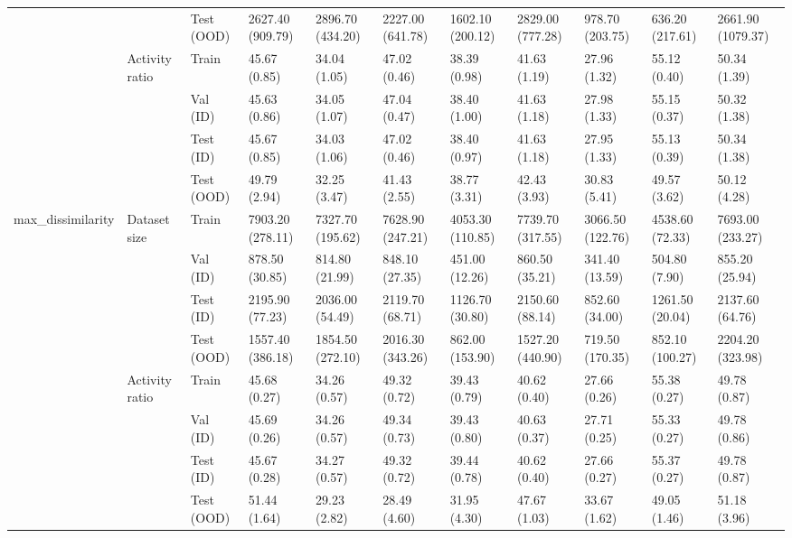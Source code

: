 \begin{tabular}{lllllllllll}
 &  & Test (OOD) & 2627.40 (909.79) & 2896.70 (434.20) & 2227.00 (641.78) & 1602.10 (200.12) & 2829.00 (777.28) & 978.70 (203.75) & 636.20 (217.61) & 2661.90 (1079.37) \\
\cline{2-11}
 & \multirow[t]{4}{*}{Activity ratio} & Train & 45.67 (0.85) & 34.04 (1.05) & 47.02 (0.46) & 38.39 (0.98) & 41.63 (1.19) & 27.96 (1.32) & 55.12 (0.40) & 50.34 (1.39) \\
 &  & Val (ID) & 45.63 (0.86) & 34.05 (1.07) & 47.04 (0.47) & 38.40 (1.00) & 41.63 (1.18) & 27.98 (1.33) & 55.15 (0.37) & 50.32 (1.38) \\
 &  & Test (ID) & 45.67 (0.85) & 34.03 (1.06) & 47.02 (0.46) & 38.40 (0.97) & 41.63 (1.18) & 27.95 (1.33) & 55.13 (0.39) & 50.34 (1.38) \\
 &  & Test (OOD) & 49.79 (2.94) & 32.25 (3.47) & 41.43 (2.55) & 38.77 (3.31) & 42.43 (3.93) & 30.83 (5.41) & 49.57 (3.62) & 50.12 (4.28) \\
\cline{1-11} \cline{2-11}
\multirow[t]{8}{*}{max_dissimilarity} & \multirow[t]{4}{*}{Dataset size} & Train & 7903.20 (278.11) & 7327.70 (195.62) & 7628.90 (247.21) & 4053.30 (110.85) & 7739.70 (317.55) & 3066.50 (122.76) & 4538.60 (72.33) & 7693.00 (233.27) \\
 &  & Val (ID) & 878.50 (30.85) & 814.80 (21.99) & 848.10 (27.35) & 451.00 (12.26) & 860.50 (35.21) & 341.40 (13.59) & 504.80 (7.90) & 855.20 (25.94) \\
 &  & Test (ID) & 2195.90 (77.23) & 2036.00 (54.49) & 2119.70 (68.71) & 1126.70 (30.80) & 2150.60 (88.14) & 852.60 (34.00) & 1261.50 (20.04) & 2137.60 (64.76) \\
 &  & Test (OOD) & 1557.40 (386.18) & 1854.50 (272.10) & 2016.30 (343.26) & 862.00 (153.90) & 1527.20 (440.90) & 719.50 (170.35) & 852.10 (100.27) & 2204.20 (323.98) \\
\cline{2-11}
 & \multirow[t]{4}{*}{Activity ratio} & Train & 45.68 (0.27) & 34.26 (0.57) & 49.32 (0.72) & 39.43 (0.79) & 40.62 (0.40) & 27.66 (0.26) & 55.38 (0.27) & 49.78 (0.87) \\
 &  & Val (ID) & 45.69 (0.26) & 34.26 (0.57) & 49.34 (0.73) & 39.43 (0.80) & 40.63 (0.37) & 27.71 (0.25) & 55.33 (0.27) & 49.78 (0.86) \\
 &  & Test (ID) & 45.67 (0.28) & 34.27 (0.57) & 49.32 (0.72) & 39.44 (0.78) & 40.62 (0.40) & 27.66 (0.27) & 55.37 (0.27) & 49.78 (0.87) \\
 &  & Test (OOD) & 51.44 (1.64) & 29.23 (2.82) & 28.49 (4.60) & 31.95 (4.30) & 47.67 (1.03) & 33.67 (1.62) & 49.05 (1.46) & 51.18 (3.96) \\
\cline{1-11} \cline{2-11}
\bottomrule
\end{tabular}
